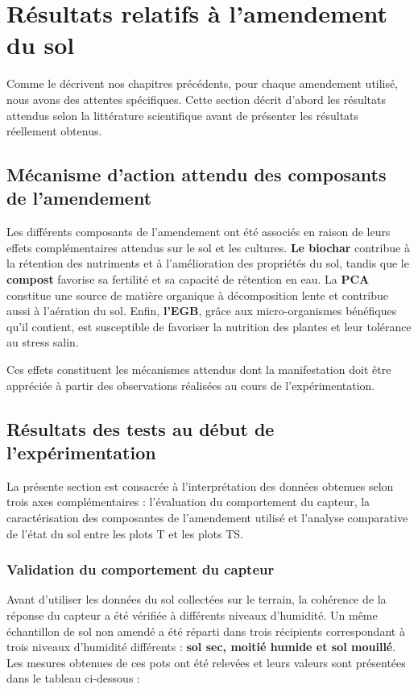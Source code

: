 \section{Résultats relatifs à l'amendement du sol}
Comme le décrivent nos chapitres précédents, pour chaque amendement utilisé, nous avons des attentes spécifiques. Cette section décrit d’abord les résultats attendus selon la littérature scientifique avant de présenter les résultats réellement obtenus.

\subsection{Mécanisme d’action attendu des composants de l’amendement}
Les différents composants de l’amendement ont été associés en raison de leurs effets complémentaires attendus sur le sol et les cultures. \textbf{Le biochar} contribue à la rétention des nutriments et à l’amélioration des propriétés du sol, tandis que le \textbf{compost} favorise sa fertilité et sa capacité de rétention en eau. La \textbf{PCA} constitue une source de matière organique à décomposition lente et contribue aussi à l'aération du sol. Enfin, \textbf{l'EGB}, grâce aux micro-organismes bénéfiques qu’il contient, est susceptible de favoriser la nutrition des plantes et leur tolérance au stress salin.

Ces effets constituent les mécanismes attendus dont la manifestation doit être appréciée à partir des observations réalisées au cours de l’expérimentation.

\subsection{Résultats des tests au début de l'expérimentation}
La présente section est consacrée à l’interprétation des données obtenues selon trois axes complémentaires : 
l’évaluation du comportement du capteur, la caractérisation des composantes de l’amendement utilisé et l’analyse comparative de l’état du sol entre les plots T et les plots TS.

\subsubsection{Validation du comportement du capteur}
Avant d’utiliser les données du sol collectées sur le terrain, la cohérence de la réponse du capteur a été vérifiée à différents niveaux d’humidité. Un même échantillon de sol non amendé a été réparti dans trois récipients correspondant à trois niveaux d'humidité différents : \textbf{sol sec, moitié humide et sol mouillé}. Les mesures obtenues de ces pots ont été relevées et leurs valeurs sont présentées dans le tableau ci-dessous :

